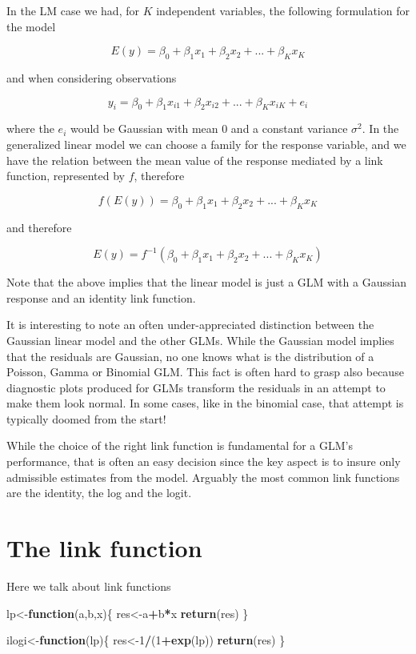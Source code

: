 \documentclass[
]{book}
\newenvironment{Shaded}{\begin{snugshade}}{\end{snugshade}}
\newcommand{\ControlFlowTok}[1]{\textcolor[rgb]{0.13,0.29,0.53}{\textbf{#1}}}
\newcommand{\DecValTok}[1]{\textcolor[rgb]{0.00,0.00,0.81}{#1}}
\newcommand{\FunctionTok}[1]{\textcolor[rgb]{0.13,0.29,0.53}{\textbf{#1}}}
\newcommand{\NormalTok}[1]{#1}
\newcommand{\OtherTok}[1]{\textcolor[rgb]{0.56,0.35,0.01}{#1}}
\newcommand{\SpecialCharTok}[1]{\textcolor[rgb]{0.81,0.36,0.00}{\textbf{#1}}}
\begin{document}
In the LM case we had, for \(K\) independent variables, the following formulation for the model

\[E(y)=\beta_0+\beta_1x_1+\beta_2x_2+...+\beta_Kx_K\]

and when considering observations

\[y_i=\beta_0+\beta_1x_{i1}+\beta_2x_{i2}+...+\beta_Kx_{iK}+e_i\]

where the \(e_i\) would be Gaussian with mean 0 and a constant variance \(\sigma^2\). In the generalized linear model we can choose a family for the response variable, and we have the relation between the mean value of the response mediated by a link function, represented by \(f\), therefore

\[f(E(y))=\beta_0+\beta_1x_1+\beta_2x_2+...+\beta_Kx_K\]

and therefore

\[E(y)=f^{-1}(\beta_0+\beta_1x_1+\beta_2x_2+...+\beta_Kx_K)\]

Note that the above implies that the linear model is just a GLM with a Gaussian response and an identity link function.

It is interesting to note an often under-appreciated distinction between the Gaussian linear model and the other GLMs. While the Gaussian model implies that the residuals are Gaussian, no one knows what is the distribution of a Poisson, Gamma or Binomial GLM. This fact is often hard to grasp also because diagnostic plots produced for GLMs transform the residuals in an attempt to make them look normal. In some cases, like in the binomial case, that attempt is typically doomed from the start!

While the choice of the right link function is fundamental for a GLM's performance, that is often an easy decision since the key aspect is to insure only admissible estimates from the model. Arguably the most common link functions are the identity, the log and the logit.

\section{The link function}\label{the-link-function}

Here we talk about link functions

\begin{Shaded}
\begin{Highlighting}[]
\NormalTok{lp}\OtherTok{\textless{}{-}}\ControlFlowTok{function}\NormalTok{(a,b,x)\{}
\NormalTok{  res}\OtherTok{\textless{}{-}}\NormalTok{a}\SpecialCharTok{+}\NormalTok{b}\SpecialCharTok{*}\NormalTok{x}
  \FunctionTok{return}\NormalTok{(res)}
\NormalTok{\}}

\NormalTok{ilogi}\OtherTok{\textless{}{-}}\ControlFlowTok{function}\NormalTok{(lp)\{}
\NormalTok{  res}\OtherTok{\textless{}{-}}\DecValTok{1}\SpecialCharTok{/}\NormalTok{(}\DecValTok{1}\SpecialCharTok{+}\FunctionTok{exp}\NormalTok{(lp))}
  \FunctionTok{return}\NormalTok{(res)}
\NormalTok{\}}
\end{Highlighting}
\end{Shaded}
\end{document}
